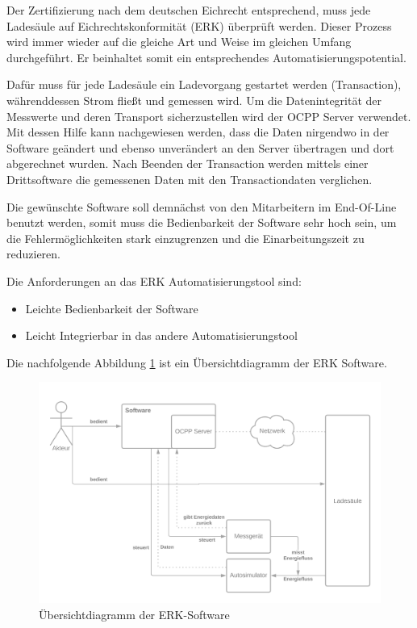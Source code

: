 Der Zertifizierung nach dem deutschen Eichrecht entsprechend, muss jede Ladesäule auf Eichrechtskonformität (ERK) überprüft werden.
Dieser Prozess wird immer wieder auf die gleiche Art und Weise im gleichen Umfang durchgeführt. 
Er beinhaltet somit ein entsprechendes Automatisierungspotential.

Dafür muss für jede Ladesäule ein Ladevorgang gestartet werden (Transaction), währenddessen Strom fließt und gemessen wird.   
Um die Datenintegrität der Messwerte und deren Transport sicherzustellen wird der OCPP Server verwendet. 
Mit dessen Hilfe kann nachgewiesen werden, 
dass die Daten nirgendwo in der Software geändert und ebenso unverändert an den Server übertragen und dort abgerechnet wurden. 
Nach Beenden der Transaction werden mittels einer Drittsoftware die gemessenen Daten mit den Transactiondaten verglichen.

Die gewünschte Software soll demnächst von den Mitarbeitern im End-Of-Line benutzt werden, somit muss die Bedienbarkeit der Software sehr hoch sein,
um die Fehlermöglichkeiten stark einzugrenzen und die Einarbeitungszeit zu reduzieren.

Die Anforderungen an das ERK Automatisierungstool sind:
\begin{itemize}
    \item Leichte Bedienbarkeit der Software
    \item Leicht Integrierbar in das andere Automatisierungstool
\end{itemize}

Die nachfolgende Abbildung \ref{fig:summaryDiagrammLibrary} ist ein Übersichtdiagramm der ERK Software.
\begin{figure}[H]
    \centering
    \includegraphics[width=1\textwidth]{./images/ERK.png}
    \caption[Übersichtdiagramm der ERK-Software]{Übersichtdiagramm der ERK-Software}
    \label{fig:summaryDiagrammLibrary}
\end{figure}
